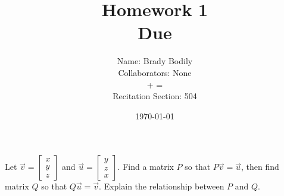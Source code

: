 \documentclass[]{exam}
\title{Homework 1\\
	Due \DTMdate{2020-01-24} %
	}
\date{ \today %
	}
\author{Name: Brady Bodily \\
        \footnotesize Collaborators: None \\
		\footnotesize 	\frownie + \twonotes = \smiley \\
		\footnotesize Recitation Section: 504 \\
		}
\begin{document}
\maketitle

\printanswers %


\begin{questions}
	\question Let $\vec{v} = \begin{bmatrix} x \\ y \\z\end{bmatrix}$ and $\vec{u} = \begin{bmatrix} y \\ z \\x\end{bmatrix}$. Find a matrix $P$ so that $P\vec{v}=\vec{u}$, then find matrix $Q$ so that $Q\vec{u} = \vec{v}$. Explain the relationship between $P$ and $Q$.
	

\end{questions}
\end{document}

